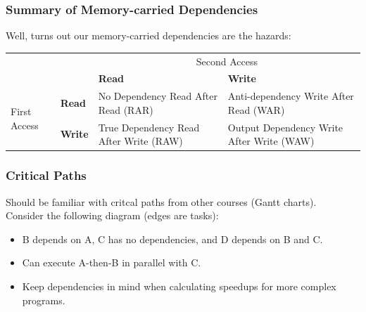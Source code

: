 \begin{frame}
\frametitle{Summary of Memory-carried Dependencies}

Well, turns out our memory-carried dependencies are the hazards:
\begin{center}
\begin{tabular}{ll|p{2.8cm}p{3.2cm}}
& & \multicolumn{2}{c}{Second Access} \\ 
&  & \bf Read & \bf Write \\ \hline
\multirow{2}{*}{First Access} & \bf Read & No Dependency Read After Read (RAR)  & Anti-dependency Write After Read (WAR) \\[0.5em]
& \bf Write & True Dependency Read After Write (RAW) & Output Dependency Write After Write (WAW) \\
\end{tabular}
\end{center}
\end{frame}



\begin{frame}
  \frametitle{Critical Paths}

  

  Should be familiar with critcal paths from other courses (Gantt charts).\\[1em]

  Consider the following diagram (edges are tasks):

\begin{center}
\end{center}

  \begin{itemize}
    \item B depends on A, C has no dependencies, and D depends on B and C.
    \item Can execute A-then-B in parallel with C.
    \item Keep dependencies in mind when calculating speedups for more
      complex programs.
  \end{itemize}
  
\end{frame}


